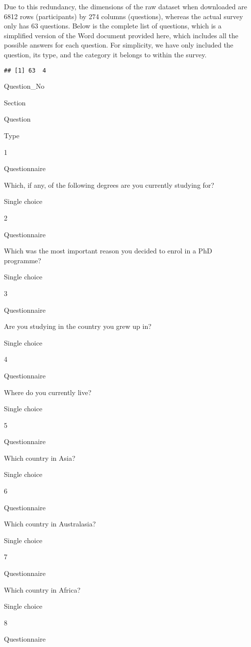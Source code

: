 \documentclass[
]{article}
\begin{document}
Due to this redundancy, the dimensions of the raw dataset when
downloaded are 6812 rows (participants) by 274 columns (questions),
whereas the actual survey only has 63 questions. Below is the complete
list of questions, which is a simplified version of the Word document
provided here, which includes all the possible answers for each
question. For simplicity, we have only included the question, its type,
and the category it belongs to within the survey.

\begin{verbatim}
## [1] 63  4
\end{verbatim}

Question\_No

Section

Question

Type

1

Questionnaire

Which, if any, of the following degrees are you currently studying for?

Single choice

2

Questionnaire

Which was the most important reason you decided to enrol in a PhD
programme?

Single choice

3

Questionnaire

Are you studying in the country you grew up in?

Single choice

4

Questionnaire

Where do you currently live?

Single choice

5

Questionnaire

Which country in Asia?

Single choice

6

Questionnaire

Which country in Australasia?

Single choice

7

Questionnaire

Which country in Africa?

Single choice

8

Questionnaire
\end{document}
